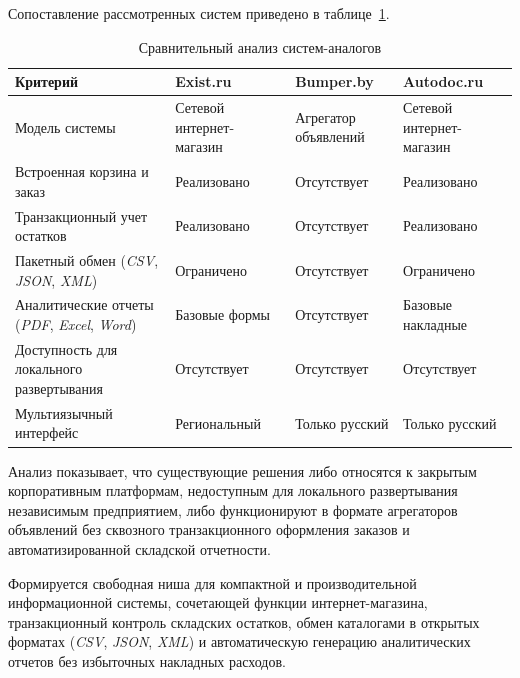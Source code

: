 Сопоставление рассмотренных систем приведено в таблице~\ref{table:analysis:analogues}.

\begin{table}[ht]
\caption{Сравнительный анализ систем-аналогов}
\label{table:analysis:analogues}
\centering
	\begin{tabular}{|>{\raggedright}m{}
	                |>{\raggedright}m{}
	                |>{\raggedright}m{}
	                |>{\raggedright\arraybackslash}m{}|}
	\hline
	\centering Критерий & \centering Exist.ru & \centering Bumper.by & \centering\arraybackslash Autodoc.ru \\
	\hline
	Модель системы & Сетевой интернет-магазин & Агрегатор объявлений & Сетевой интернет-магазин \\
	\hline
	Встроенная корзина и заказ & Реализовано & Отсутствует & Реализовано \\
	\hline
	Транзакционный учет остатков & Реализовано & Отсутствует & Реализовано \\
	\hline
	Пакетный обмен (\textit{CSV}, \textit{JSON}, \textit{XML}) & Ограничено & Отсутствует & Ограничено \\
	\hline
	Аналитические отчеты (\textit{PDF}, \textit{Excel}, \textit{Word}) & Базовые формы & Отсутствует & Базовые накладные \\
	\hline
	Доступность для локального развертывания & Отсутствует & Отсутствует & Отсутствует \\
	\hline
	Мультиязычный интерфейс & Региональный & Только русский & Только русский \\
	\hline
	\end{tabular}
\end{table}

Анализ показывает, что существующие решения либо относятся к закрытым корпоративным платформам, недоступным для локального развертывания независимым предприятием, либо функционируют в формате агрегаторов объявлений без сквозного транзакционного оформления заказов и автоматизированной складской отчетности.

Формируется свободная ниша для компактной и производительной информационной системы, сочетающей функции интернет-магазина, транзакционный контроль складских остатков, обмен каталогами в открытых форматах (\textit{CSV}, \textit{JSON}, \textit{XML}) и автоматическую генерацию аналитических отчетов без избыточных накладных расходов.
